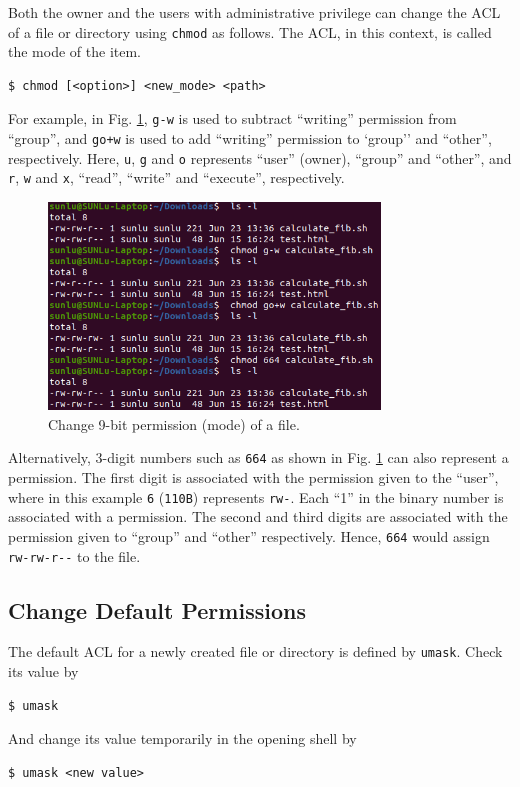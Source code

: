 Both the owner and the users with administrative privilege can change the ACL of a file or directory using \verb|chmod| as follows. The ACL, in this context, is called the mode of the item.
\begin{lstlisting}
$ chmod [<option>] <new_mode> <path>
\end{lstlisting}
For example, in Fig. \ref{ch:fm:fig:chmodexp}, \verb|g-w| is used to subtract ``writing'' permission from ``group'', and \verb|go+w| is used to add ``writing'' permission to `group'' and ``other'', respectively. Here, \verb|u|, \verb|g| and \verb|o| represents ``user'' (owner), ``group'' and ``other'', and \verb|r|, \verb|w| and \verb|x|, ``read'', ``write'' and ``execute'', respectively.
\begin{figure}[htbp]
	\centering
	\includegraphics[width=250pt]{chapters/part-1/figures/chmodexp.png}
	\caption{Change 9-bit permission (mode) of a file.} \label{ch:fm:fig:chmodexp}
\end{figure}
Alternatively, 3-digit numbers such as \verb|664| as shown in Fig. \ref{ch:fm:fig:chmodexp} can also represent a permission. The first digit is associated with the permission given to the ``user'', where in this example \verb|6| (\verb|110B|) represents \verb|rw-|. Each ``1'' in the binary number is associated with a permission. The second and third digits are associated with the permission given to ``group'' and ``other'' respectively. Hence, \verb|664| would assign \verb|rw-rw-r--| to the file.

\subsection{Change Default Permissions}

The default ACL for a newly created file or directory is defined by \verb|umask|. Check its value by
\begin{lstlisting}
$ umask
\end{lstlisting}
And change its value temporarily in the opening shell by
\begin{lstlisting}
$ umask <new value>
\end{lstlisting}

